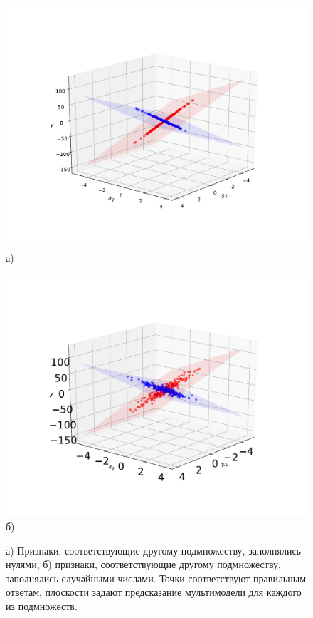 \documentclass[12pt, twoside]{article}
\begin{document}
\begin{figure}[h]
\begin{center}
\begin{minipage}[h]{0.49\linewidth}
\begin{center}\includegraphics[width=1.2\linewidth]{experiment2-zeros.pdf}  а) \end{center}
\end{minipage}
\hfill
\begin{minipage}[h]{0.49\linewidth}
\begin{center}\includegraphics[width=1.2\linewidth]{experiment2-random.pdf}  б) \end{center}
\end{minipage}
\caption{а) Признаки, соответствующие другому подмножеству, заполнялись нулями, б) признаки, соответствующие другому подмножеству, заполнялись случайными числами. Точки соответствуют правильным ответам, плоскости задают предсказание мультимодели для каждого из подмножеств.}
\label{ris:image1}
\end{center}
\end{figure}





\end{document}
